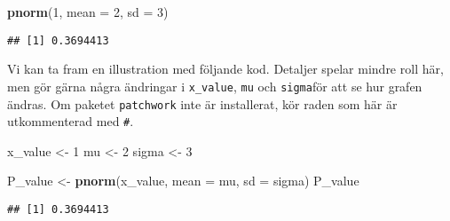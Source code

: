\documentclass[
]{book}
\newenvironment{Shaded}{\begin{snugshade}}{\end{snugshade}}
\newcommand{\AttributeTok}[1]{\textcolor[rgb]{0.13,0.29,0.53}{#1}}
\newcommand{\DecValTok}[1]{\textcolor[rgb]{0.00,0.00,0.81}{#1}}
\newcommand{\FunctionTok}[1]{\textcolor[rgb]{0.13,0.29,0.53}{\textbf{#1}}}
\newcommand{\NormalTok}[1]{#1}
\newcommand{\OtherTok}[1]{\textcolor[rgb]{0.56,0.35,0.01}{#1}}
\theoremstyle{definition}
\theoremstyle{definition}
\theoremstyle{definition}
\theoremstyle{definition}
\theoremstyle{remark}
\begin{document}
\begin{Shaded}
\begin{Highlighting}[]
\FunctionTok{pnorm}\NormalTok{(}\DecValTok{1}\NormalTok{, }\AttributeTok{mean =} \DecValTok{2}\NormalTok{, }\AttributeTok{sd =} \DecValTok{3}\NormalTok{)}
\end{Highlighting}
\end{Shaded}

\begin{verbatim}
## [1] 0.3694413
\end{verbatim}

Vi kan ta fram en illustration med följande kod. Detaljer spelar mindre roll här, men gör gärna några ändringar i \texttt{x\_value}, \texttt{mu} och \texttt{sigma}för att se hur grafen ändras. Om paketet \texttt{patchwork} inte är installerat, kör raden som här är utkommenterad med \texttt{\#}.

\begin{Shaded}
\begin{Highlighting}[]
\NormalTok{x\_value }\OtherTok{\textless{}{-}} \DecValTok{1}
\NormalTok{mu }\OtherTok{\textless{}{-}} \DecValTok{2}
\NormalTok{sigma }\OtherTok{\textless{}{-}} \DecValTok{3}

\NormalTok{P\_value }\OtherTok{\textless{}{-}} \FunctionTok{pnorm}\NormalTok{(x\_value, }\AttributeTok{mean =}\NormalTok{ mu, }\AttributeTok{sd =}\NormalTok{ sigma)}
\NormalTok{P\_value}
\end{Highlighting}
\end{Shaded}

\begin{verbatim}
## [1] 0.3694413
\end{verbatim}
\end{document}
